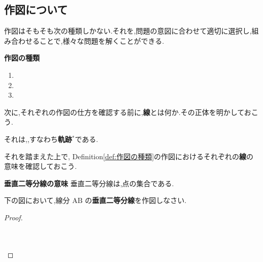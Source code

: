 \subsection{作図について}
    作図はそもそも次の\fitblank[3]{}種類しかない.それを,問題の意図に合わせて適切に選択し,組み合わせることで,様々な問題を解くことができる.

    \begin{definitionbox}{\textbf{作図の種類}}
        \label{def:作図の種類}
        \begin{enumerate}
            \item {}
            \item {}
            \item {}
        \end{enumerate}
    \end{definitionbox}
\vspace{1em}

    次に,それぞれの作図の仕方を確認する前に,\textbf{線}とは何か.その正体を明かしておこう.

    それは,\fitblankbf[条件を満たす点の集合]{},すなわち\textbf{軌跡$^{*}$}である.

    それを踏まえた上で, Definition\ref{def:作図の種類}の作図におけるそれぞれの\textbf{線}の意味を確認しておこう.
\vspace{1em}

    \begin{theorembox}{\textbf{垂直二等分線の意味}}
        \label{thm:垂直二等分線の意味}
        垂直二等分線は,\fitblankbf[2点間の距離が等しい]{}点の集合である.
    \end{theorembox}
\vspace{-1.5em}

    \begin{example}[【例題 1】]
        下の図において,線分 $\mathrm{AB}$ の\textbf{垂直二等分線}を作図しなさい.
    \end{example}

    \begin{proof}\mbox{}\\
        \\
        \\
        \begin{center}
        \end{center}
        \vspace{2em}
    \end{proof}

